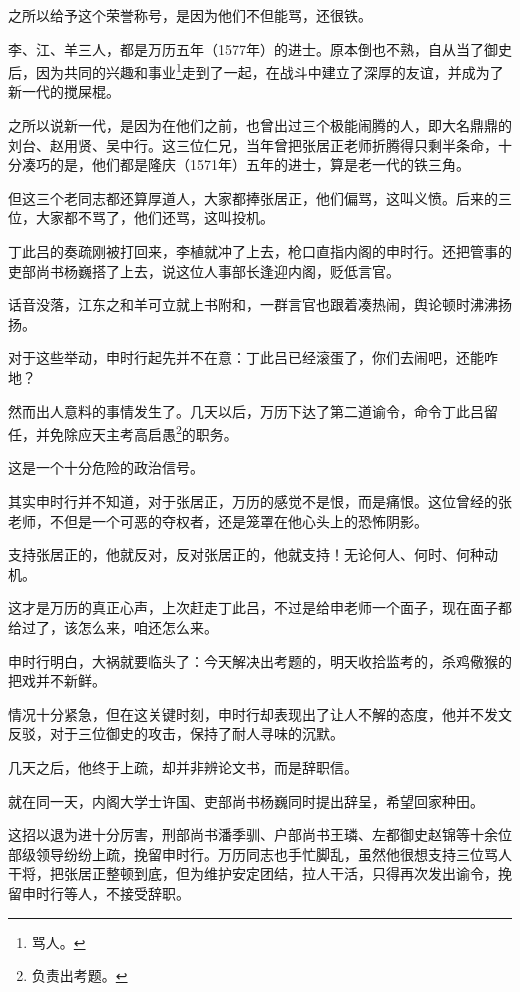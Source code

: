 \begin{multicols}{\theparacolNo}
		之所以给予这个荣誉称号，是因为他们不但能骂，还很铁。

		李、江、羊三人，都是万历五年（1577年）的进士。原本倒也不熟，自从当了御史后，因为共同的兴趣和事业\footnote{骂人。}走到了一起，在战斗中建立了深厚的友谊，并成为了新一代的搅屎棍。

		之所以说新一代，是因为在他们之前，也曾出过三个极能闹腾的人，即大名鼎鼎的刘台、赵用贤、吴中行。这三位仁兄，当年曾把张居正老师折腾得只剩半条命，十分凑巧的是，他们都是隆庆（1571年）五年的进士，算是老一代的铁三角。

		但这三个老同志都还算厚道人，大家都捧张居正，他们偏骂，这叫义愤。后来的三位，大家都不骂了，他们还骂，这叫投机。

		丁此吕的奏疏刚被打回来，李植就冲了上去，枪口直指内阁的申时行。还把管事的吏部尚书杨巍搭了上去，说这位人事部长逢迎内阁，贬低言官。

		话音没落，江东之和羊可立就上书附和，一群言官也跟着凑热闹，舆论顿时沸沸扬扬。

		对于这些举动，申时行起先并不在意：丁此吕已经滚蛋了，你们去闹吧，还能咋地？

		然而出人意料的事情发生了。几天以后，万历下达了第二道谕令，命令丁此吕留任，并免除应天主考高启愚\footnote{负责出考题。}的职务。

		这是一个十分危险的政治信号。

		其实申时行并不知道，对于张居正，万历的感觉不是恨，而是痛恨。这位曾经的张老师，不但是一个可恶的夺权者，还是笼罩在他心头上的恐怖阴影。

		支持张居正的，他就反对，反对张居正的，他就支持！无论何人、何时、何种动机。

		这才是万历的真正心声，上次赶走丁此吕，不过是给申老师一个面子，现在面子都给过了，该怎么来，咱还怎么来。

		申时行明白，大祸就要临头了：今天解决出考题的，明天收拾监考的，杀鸡儆猴的把戏并不新鲜。

		情况十分紧急，但在这关键时刻，申时行却表现出了让人不解的态度，他并不发文反驳，对于三位御史的攻击，保持了耐人寻味的沉默。

		几天之后，他终于上疏，却并非辨论文书，而是辞职信。

		就在同一天，内阁大学士许国、吏部尚书杨巍同时提出辞呈，希望回家种田。

		这招以退为进十分厉害，刑部尚书潘季驯、户部尚书王璘、左都御史赵锦等十余位部级领导纷纷上疏，挽留申时行。万历同志也手忙脚乱，虽然他很想支持三位骂人干将，把张居正整顿到底，但为维护安定团结，拉人干活，只得再次发出谕令，挽留申时行等人，不接受辞职。


\end{multicols}
